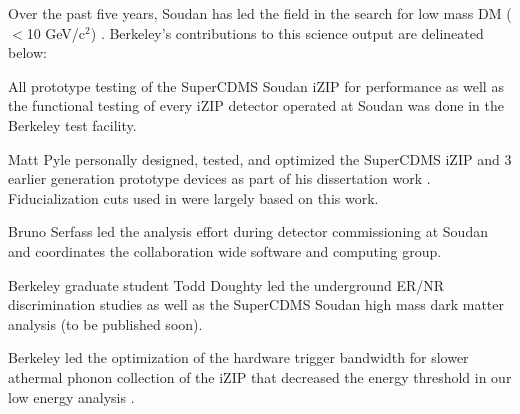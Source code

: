 Over the past five years, \SuperCDMS Soudan has led the field in the search for low mass DM ($<$10 GeV/c$^{2}$) \cite{Agnese:2015nto,Agnese:2014aze,Agnese:13prl2}. Berkeley's contributions to this science output are delineated below:


\begin{compactitem}
	\item All prototype testing of the SuperCDMS Soudan iZIP for performance as well as the functional testing of every iZIP detector operated at Soudan was done in the Berkeley test facility.  
	\item Matt Pyle personally designed, tested, and optimized the SuperCDMS iZIP and 3 earlier generation prototype devices as part of his dissertation work  \cite{Pyle:12phd}. Fiducialization cuts used in \cite{Agnese:2015nto,Agnese:2014aze} were largely based on this work.
	\item Bruno Serfass led the  analysis effort during detector commissioning at Soudan and coordinates the collaboration wide software and computing group.
	\item Berkeley graduate student Todd Doughty led the underground ER/NR discrimination studies \cite{Agnese:13apl} as well as the SuperCDMS Soudan high mass dark matter analysis (to be published soon). 
	\item Berkeley led the optimization of the hardware trigger bandwidth for slower athermal phonon collection of the iZIP %
	 that decreased the energy threshold in our low energy analysis \cite{Agnese:2015nto}.
\end{compactitem}

